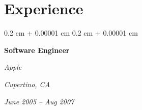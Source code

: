 \documentclass[10pt, letterpaper]{article}
\newenvironment{highlights}{
    \begin{itemize}[
        topsep=0.10 cm,
        parsep=0.10 cm,
        partopsep=0pt,
        itemsep=0pt,
        leftmargin=0.4 cm + 10pt
    ]
}{
    \end{itemize}
} %
\newenvironment{onecolentry}{
    \begin{adjustwidth}{
        0.2 cm + 0.00001 cm
    }{
        0.2 cm + 0.00001 cm
    }
}{
    \end{adjustwidth}
} %
\newenvironment{twocolentry}[2][]{
    \onecolentry
    \def\secondColumn{#2}
    \setcolumnwidth{\fill, 10.5 cm}
    \begin{paracol}{2}
}{
    \switchcolumn \raggedleft \secondColumn
    \end{paracol}
    \endonecolentry
} %
\let\hrefWithoutArrow\href
\renewcommand{\href}[2]{\hrefWithoutArrow{#1}{\ifthenelse{\equal{#2}{}}{ }{#2 }\raisebox{.15ex}{\footnotesize \faExternalLink*}}}
\begin{document}








    
    \section{Experience}



        
        \begin{twocolentry}{
        \textit{Cupertino, CA}    
            
        \textit{June 2005 – Aug 2007}}
            \textbf{Software Engineer}
            
            \textit{Apple}
        \end{twocolentry}
\end{document}
